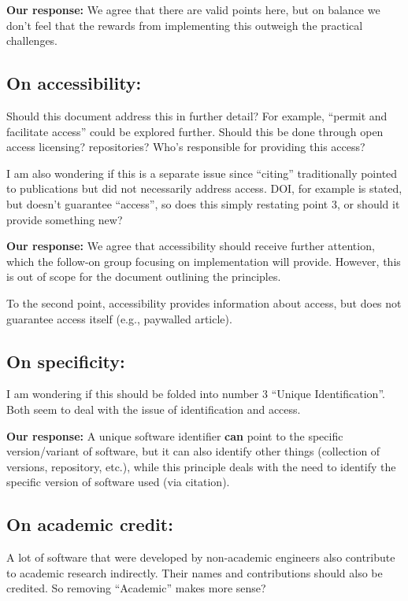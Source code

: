\documentclass[12pt, oneside]{amsart}
\begin{document}
\textbf{Our response:}
We agree that there are valid points here, but on balance we don't feel that the rewards from implementing this outweigh the practical challenges.

\subsection{On accessibility:} Should this document address this in further detail? For example, ``permit and facilitate access'' could be explored further. Should this be done through open access licensing? repositories? Who's responsible for providing this access?

I am also wondering if this is a separate issue since ``citing'' traditionally pointed to publications but did not necessarily address access. DOI, for example is stated, but doesn't guarantee ``access'', so does this simply restating point 3, or should it provide something new?

\textbf{Our response:}
We agree that accessibility should receive further attention, which the follow-on group focusing on implementation will provide. However, this is out of scope for the document outlining the principles.

To the second point, accessibility provides information about access, but does not guarantee access itself (e.g., paywalled article).

\subsection{On specificity:} I am wondering if this should be folded into number 3 ``Unique Identification''. Both seem to deal with the issue of identification and access.

\textbf{Our response:} A unique software identifier \textbf{can} point to the specific version\slash variant of software, but it can also identify other things (collection of versions, repository, etc.), while this principle deals with the need to identify the specific version of software used (via citation).

\subsection{On academic credit:} A lot of software that were developed by non-academic engineers also contribute to academic research indirectly. Their names and contributions should also be credited. So removing ``Academic'' makes more sense?
\end{document}
